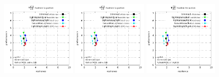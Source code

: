 \documentclass[11pt,letterpaper]{article}
\begin{document}
\begin{figure}
  \includegraphics[width=0.32\textwidth,page=30]{figures/grooming-scan-levels.pdf}
  \hfill
  \includegraphics[width=0.32\textwidth,page=18]{figures/grooming-scan-levels.pdf}
  \hfill
  \includegraphics[width=0.32\textwidth,page=36]{figures/grooming-scan-levels.pdf}
  \caption{}\label{fig:grooming-ATLAS}
\end{figure}
\end{document}
